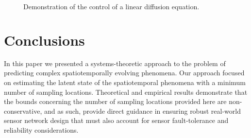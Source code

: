 \begin{figure}[tbh] %
    \centering
    \caption{Demonstration of the control of a linear diffusion equation.}     
\end{figure} 

\section{Conclusions}\label{sec:conclusion}
In this paper we presented a systems-theoretic approach to the problem of predicting complex spatiotemporally evolving phenomena. Our approach focused on estimating the latent state of the spatiotemporal phenomena with a minimum number of sampling locations. Theoretical and empirical results demonstrate that the bounds concerning the number of sampling locations provided here are non-conservative, and as such, provide direct guidance in ensuring robust real-world sensor network design that must also account for sensor fault-tolerance and reliability considerations. %